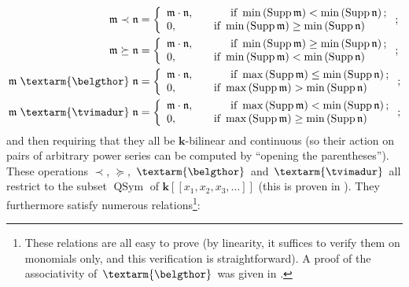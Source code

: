 \documentclass[numbers=enddot,12pt,final,onecolumn,notitlepage]{scrartcl}%
\theoremstyle{definition}
\newcommand{\tvi}{\left. \textarm{\tvimadur} \right.}
\newcommand{\bel}{\left. \textarm{\belgthor} \right.}
\begin{document}
\begin{align*}
\mathfrak{m}\left.  \prec\right.  \mathfrak{n}  &  =\left\{
\begin{array}
[c]{l}%
\mathfrak{m}\cdot\mathfrak{n},\ \ \ \ \ \ \ \ \ \ \text{if }\min\left(
\operatorname*{Supp}\mathfrak{m}\right)  <\min\left(  \operatorname*{Supp}%
\mathfrak{n}\right)  ;\\
0,\ \ \ \ \ \ \ \ \ \ \text{if }\min\left(  \operatorname*{Supp}%
\mathfrak{m}\right)  \geq\min\left(  \operatorname*{Supp}\mathfrak{n}\right)
\end{array}
\right.  ;\\
\mathfrak{m}\left.  \succeq\right.  \mathfrak{n}  &  =\left\{
\begin{array}
[c]{l}%
\mathfrak{m}\cdot\mathfrak{n},\ \ \ \ \ \ \ \ \ \ \text{if }\min\left(
\operatorname*{Supp}\mathfrak{m}\right)  \geq\min\left(  \operatorname*{Supp}%
\mathfrak{n}\right)  ;\\
0,\ \ \ \ \ \ \ \ \ \ \text{if }\min\left(  \operatorname*{Supp}%
\mathfrak{m}\right)  <\min\left(  \operatorname*{Supp}\mathfrak{n}\right)
\end{array}
\right.  ;\\
\mathfrak{m}\bel\mathfrak{n}  &  =\left\{
\begin{array}
[c]{l}%
\mathfrak{m}\cdot\mathfrak{n},\ \ \ \ \ \ \ \ \ \ \text{if }\max\left(
\operatorname*{Supp}\mathfrak{m}\right)  \leq\min\left(  \operatorname*{Supp}%
\mathfrak{n}\right)  ;\\
0,\ \ \ \ \ \ \ \ \ \ \text{if }\max\left(  \operatorname*{Supp}%
\mathfrak{m}\right)  >\min\left(  \operatorname*{Supp}\mathfrak{n}\right)
\end{array}
\right.  ;\\
\mathfrak{m}\tvi\mathfrak{n}  &  =\left\{
\begin{array}
[c]{l}%
\mathfrak{m}\cdot\mathfrak{n},\ \ \ \ \ \ \ \ \ \ \text{if }\max\left(
\operatorname*{Supp}\mathfrak{m}\right)  <\min\left(  \operatorname*{Supp}%
\mathfrak{n}\right)  ;\\
0,\ \ \ \ \ \ \ \ \ \ \text{if }\max\left(  \operatorname*{Supp}%
\mathfrak{m}\right)  \geq\min\left(  \operatorname*{Supp}\mathfrak{n}\right)
\end{array}
\right.  ;
\end{align*}
and then requiring that they all be $\mathbf{k}$-bilinear and continuous (so
their action on pairs of arbitrary power series can be computed by
\textquotedblleft opening the parentheses\textquotedblright). These operations
$\left.  \prec\right.  $, $\left.  \succeq\right.  $, $\bel$ and $\tvi$ all
restrict to the subset $\operatorname*{QSym}$ of $\mathbf{k}\left[  \left[
x_{1},x_{2},x_{3},\ldots\right]  \right]  $ (this is proven in \cite[detailed
version, Section 3]{dimcr}). They furthermore satisfy numerous
relations\footnote{These relations are all easy to prove (by linearity, it
suffices to verify them on monomials only, and this verification is
straightforward). A proof of the associativity of $\bel$ was given in
\cite[detailed version, Proposition 3.4]{dimcr}.}:
\end{document}

